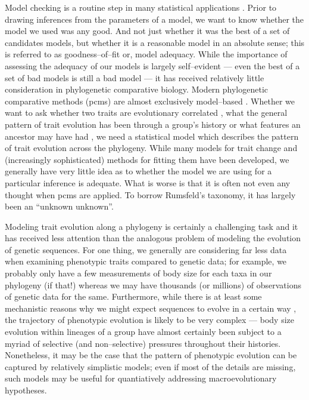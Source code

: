 \documentclass[12pt]{article}
\begin{document}
\noindent Model checking is a routine step in many statistical applications \citep[e.g.][ch. 6]{Gelmanbook}. Prior to drawing inferences from the parameters of a model, we want to know whether the model we used was any good. And not just whether it was the best of a set of candidates models, but whether it is a reasonable model in an absolute sense; this is referred to as goodness--of--fit or, model adequacy. While the importance of assessing the adequacy of our models is largely self--evident --- even the best of a set of bad models is still a bad model --- it has received relatively little consideration in phylogenetic comparative biology. Modern phylogenetic comparative methods (pcms) are almost exclusively model--based \citep[recently reviewed in][]{Omeara2012, PennellHarmon}. Whether we want to ask whether two traits are evolutionary correlated \citep[e.g.][]{Felsenstein1985, Grafen1989, HarveyPagel1991}, what the general pattern of trait evolution has been through a group's history \citep[e.g.][]{Mooers1999, Harmon2010, Hunt2012} or what features an ancestor may have had \citep[e.g.][]{Schluter1997, Huelsenbeck2003}, we need a statistical model which describes the pattern of trait evolution across the phylogeny. While many models for trait change and (increasingly sophisticated) methods for fitting them have been developed, we generally have very little idea as to whether the model we are using for a particular inference is adequate. What is worse is that it is often not even any thought when pcms are applied. To borrow Rumsfeld's taxonomy, it has largely been an ``unknown unknown''.

Modeling trait evolution along a phylogeny is certainly a challenging task and it has received less attention than the analogous problem of modeling the evolution of genetic sequences. For one thing, we generally are considering far less data when examining phenotypic traits compared to genetic data; for example, we probably only have a few  measurements of body size for each taxa in our phylogeny (if that!) whereas we may have thousands (or millions) of observations of genetic data for the same. Furthermore, while there is at least some mechanistic reasons why we might expect sequences to evolve in a certain way \citep{Kimura1983, Ohna1970, Wakeley2008}, the trajectory of phenotypic evolution is likely to be very complex --- body size evolution within lineages of a group have almost certainly been subject to a myriad of selective (and non--selective) pressures throughout their histories. Nonetheless, it may be the case that the pattern of phenotypic evolution can be captured by relatively simplistic models; even if most of the details are missing, such models may be useful for quantiatively addressing macroevolutionary hypotheses. 
\end{document}
